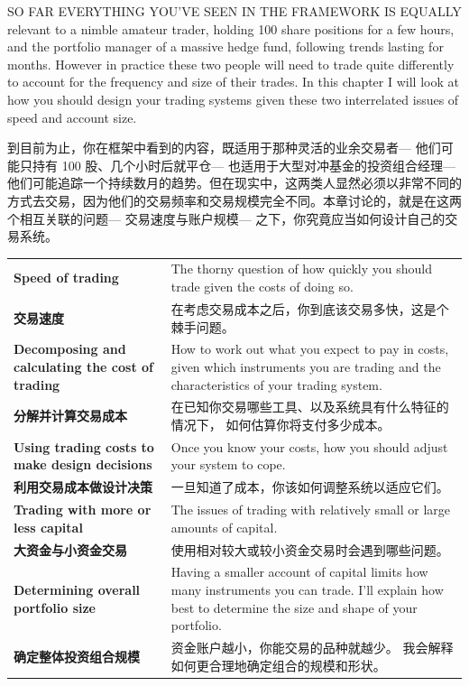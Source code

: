 
\begin{englishblock} SO FAR EVERYTHING YOU'VE SEEN IN THE FRAMEWORK IS EQUALLY relevant to a nimble amateur trader, holding 100 share positions for a few hours, and the portfolio manager of a massive hedge fund, following trends lasting for months. However in practice these two people will need to trade quite differently to account for the frequency and size of their trades. In this chapter I will look at how you should design your trading systems given these two interrelated issues of speed and account size. \end{englishblock}

\begin{chineseblock}到目前为止，你在框架中看到的内容，既适用于那种灵活的业余交易者--- 他们可能只持有 100 股、几个小时后就平仓--- 也适用于大型对冲基金的投资组合经理--- 他们可能追踪一个持续数月的趋势。但在现实中，这两类人显然必须以非常不同的方式去交易，因为他们的交易频率和交易规模完全不同。本章讨论的，就是在这两个相互关联的问题--- 交易速度与账户规模--- 之下，你究竟应当如何设计自己的交易系统。\end{chineseblock}


\begin{bilingualtableblock} \begin{tabularx}{\textwidth}{@{} L{0.30\textwidth} Y@{}}\textbf{Speed of trading} & The thorny question of how quickly you should trade given the costs of doing so. \\

\textbf{交易速度} & 在考虑交易成本之后，你到底该交易多快，这是个棘手问题。 \\
\textbf{Decomposing and calculating the cost of trading} & How to work out what you expect to pay in costs, given which instruments you are trading and the characteristics of your trading system. \\
\textbf{分解并计算交易成本} & 在已知你交易哪些工具、以及系统具有什么特征的情况下， 如何估算你将支付多少成本。 \\
\textbf{Using trading costs to make design decisions} & Once you know your costs, how you should adjust your system to cope. \\
\textbf{利用交易成本做设计决策} & 一旦知道了成本，你该如何调整系统以适应它们。 \\
\textbf{Trading with more or less capital} & The issues of trading with relatively small or large amounts of capital. \\
\textbf{大资金与小资金交易} & 使用相对较大或较小资金交易时会遇到哪些问题。 \\
\textbf{Determining overall portfolio size} & Having a smaller account of capital limits how many instruments you can trade. I’ll explain how best to determine the size and shape of your portfolio. \\
\textbf{确定整体投资组合规模} & 资金账户越小，你能交易的品种就越少。 我会解释如何更合理地确定组合的规模和形状。 \\
\end{tabularx}
\end{bilingualtableblock}

